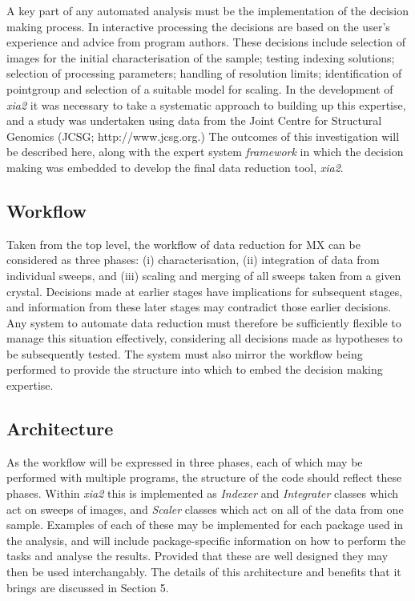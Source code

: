 \documentclass[preprint,pdf]{iucr}
\begin{document}
A key part of any automated analysis must be the implementation of the
decision making process. In interactive processing the decisions are
based on the user's experience and advice from program authors. These
decisions include selection of images for the initial characterisation
of the sample; testing indexing solutions; selection of processing
parameters; handling of resolution limits; identification of pointgroup and
selection of a suitable model for scaling. In the development of
\emph{xia2} it was necessary to take a systematic approach to building
up this expertise, and a study was undertaken using data from the
Joint Centre
for Structural Genomics (JCSG; http://www.jcsg.org.) The
outcomes of this investigation will be described here, along with the
expert system \emph{framework} in which the decision making was
embedded to develop the final data reduction tool, \emph{xia2}.

\subsection{Workflow}

Taken from the top level, the workflow of data reduction for MX
can be considered as three phases:
(i) characterisation, (ii) integration of data from individual sweeps,
and (iii) scaling and merging of all sweeps taken from a given
crystal. Decisions made at earlier stages have implications for
subsequent stages, and information from these later stages may
contradict those earlier decisions. Any system to automate data
reduction must therefore be sufficiently flexible to manage this
situation effectively, considering all decisions made as hypotheses
to be subsequently tested. The system must also mirror the workflow being
performed to provide the structure into which to embed the decision
making expertise.

\subsection{Architecture}

As the workflow will be expressed in three phases, each of which may
be performed with multiple programs, the structure of the code should
reflect these phases. Within \emph{xia2} this is implemented as
\emph{Indexer} and \emph{Integrater} classes which act on sweeps of
images, and \emph{Scaler} classes which act on all of the data from
one sample. Examples of each of these may be implemented for each
package used in the analysis, and will include package-specific
information on how to perform the tasks and analyse the
results. Provided that these are well designed they may then be used
interchangably. The details of this architecture and benefits that it
brings are discussed in Section 5.
\end{document}

